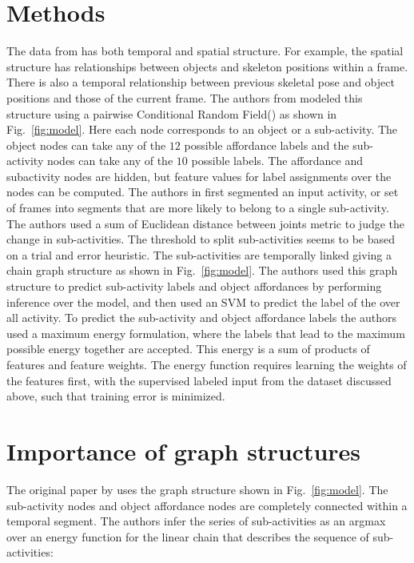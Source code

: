 \documentclass{article} %
\begin{document}
\section{Methods}
The data from \cite{koppula2013detectingactivitiesrgbd} has both temporal and spatial structure. For example, the spatial structure has relationships between objects and skeleton positions within a frame. There is also a temporal relationship between previous skeletal pose and object positions and those of the current frame. The authors from \cite{koppula2013detectingactivitiesrgbd} modeled this structure using a pairwise Conditional Random Field(\cite{sutton06introduction}) as shown in 
Fig.~\ref{fig:model}. 
Here each node corresponds to an object or a sub-activity. The object nodes can take any of the $12$ possible affordance labels and the sub-activity nodes can take any of the $10$ possible labels. The affordance and subactivity nodes are hidden, but feature values for label assignments over the nodes can be computed. The authors in \cite{koppula2013detectingactivitiesrgbd} first segmented an input activity, or set of frames into segments that are more likely to belong to a single sub-activity. The authors used a sum of Euclidean distance between joints metric to judge the change in sub-activities. The threshold to split sub-activities seems to be based on a trial and error heuristic. The sub-activities are temporally linked giving a chain graph structure as shown in Fig.~\ref{fig:model}. The authors used this graph structure to predict sub-activity labels and object affordances by performing inference over the model, and then used an SVM to predict the label of the over all activity. To predict the sub-activity and object affordance labels the authors used a maximum energy formulation, where the labels that lead to the maximum possible energy together are accepted. This energy is a sum of products of features and feature weights. The energy function requires learning the weights of the features first, with the supervised labeled input from the dataset discussed above, such that training error is minimized. 


\section{Importance of graph structures}
The original paper by \cite{koppula2013detectingactivitiesrgbd} uses the graph structure shown in Fig.~\ref{fig:model}. The sub-activity nodes and object affordance nodes are completely connected within a temporal segment. The authors infer the series of sub-activities as an argmax over an energy function for the linear chain that describes the sequence of sub-activities:
\end{document}
